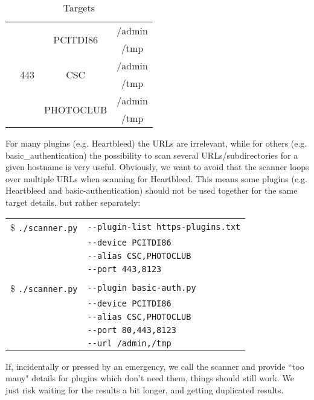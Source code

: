 \begin{table}
\begin{center}
\begin{tabular}{ | c | c | c | c |}
    & \multirow{6}{*}{443} &     \multirow{2}{*}{PCITDI86} & /admin
   \\
    \cline{4-4}
       &     &     & /tmp
    \\
     \cline{3-4}
	& & \multirow{2}{*}{CSC} & /admin
	\\
	 \cline{4-4}
       &     &     & /tmp
    \\
     \cline{3-4}
 	& & \multirow{2}{*}{PHOTOCLUB} & /admin
	\\
	 \cline{4-4}
       &     &     & /tmp

	
        \\ \hline
    \end{tabular}
    \caption{Targets}
    \label{table:targets}
   \end{center}
\end{table}

For many plugins (e.g. Heartbleed) the URLs are irrelevant, while for others (e.g. basic\_authentication) the possibility to scan several URLs/subdirectories for a given hostname is very useful. Obviously, we want to avoid that the scanner loops over multiple URLs when scanning for Heartbleed. This means some plugins (e.g. Heartbleed and basic-authentication) should not be used together for the same target details, but rather separately: 

\begin{table}[H]
    \begin{tabular}{ c  l }


\$ \texttt{./scanner.py} & \texttt{-{}-plugin-list https-plugins.txt} \\
  & \texttt{-{}-device PCITDI86} \\
  & \texttt{-{}-alias CSC,PHOTOCLUB}\\
  & \texttt{-{}-port 443,8123}\\
  \\
  
    	       \$ \texttt{./scanner.py} & \texttt{-{}-plugin basic-auth.py} \\
  & \texttt{-{}-device PCITDI86} \\
  & \texttt{-{}-alias CSC,PHOTOCLUB}\\
  & \texttt{-{}-port 80,443,8123}\\
    	       & \texttt{-{}-url /admin,/tmp}
    	       
	\end{tabular}
    
\end{table}
\noindent
If, incidentally or pressed by an emergency, we call the scanner and provide ``too many" details for plugins which don't need them, things should still work. We just risk waiting for the results a bit longer, and getting duplicated results.
